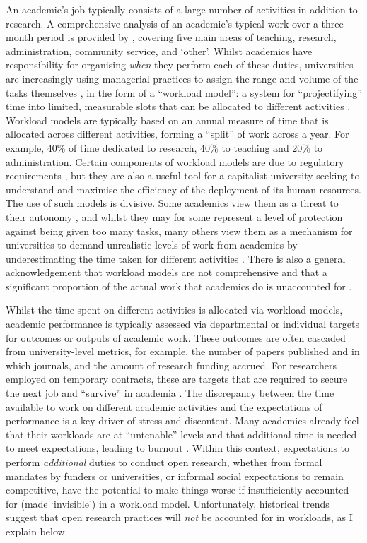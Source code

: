 \documentclass[ authordate, meta, issue]{jote-new-article}
\begin{document}
An academic’s job typically consists of a large number of activities in addition to research. A comprehensive analysis of an academic’s typical work over a three-month period is provided by \textcite{Miller2019}, covering five main areas of teaching, research, administration, community service, and ‘other’. Whilst academics have responsibility for organising \emph{when} they perform each of these duties, universities are increasingly using managerial practices to assign the range and volume of the tasks themselves \parencites{Kenny2022}, in the form of a “workload model”: a system for “projectifying” time into limited, measurable slots that can be allocated to different activities \parencites{Dollinger2020}. Workload models are typically based on an annual measure of time that is allocated across different activities, forming a “split” of work across a year. For example, 40\% of time dedicated to research, 40\% to teaching and 20\% to administration. Certain components of workload models are due to regulatory requirements \parencites{Kernohan2019}, but they are also a useful tool for a capitalist university seeking to understand and maximise the efficiency of the deployment of its human resources. The use of such models is divisive. Some academics view them as a threat to their autonomy \parencites{Boncori2020}, and whilst they may for some represent a level of protection against being given too many tasks, many others view them as a mechanism for universities to demand unrealistic levels of work from academics by underestimating the time taken for different activities \parencites{Papadopoulos2017}. There is also a general acknowledgement that workload models are not comprehensive and that a significant proportion of the actual work that academics do is unaccounted for \parencites{Kenny2019}{Miller2019}.



Whilst the time spent on different activities is allocated via workload models, academic performance is typically assessed via departmental or individual targets for outcomes or outputs of academic work. These outcomes are often cascaded from university-level metrics, for example, the number of papers published and in which journals, and the amount of research funding accrued. For researchers employed on temporary contracts, these are targets that are required to secure the next job and “survive” in academia \parencites{Anderson2007}. The discrepancy between the time available to work on different academic activities and the expectations of performance is a key driver of stress and discontent. Many academics already feel that their workloads are at “untenable” levels and that additional time is needed to meet expectations, leading to burnout \parencites{Beatson2021}. Within this context, expectations to perform \emph{additional} duties to conduct open research, whether from formal mandates by funders or universities, or informal social expectations to remain competitive, have the potential to make things worse if insufficiently accounted for (made ‘invisible’) in a workload model. Unfortunately, historical trends suggest that open research practices will \emph{not} be accounted for in workloads, as I explain below.
\end{document}
